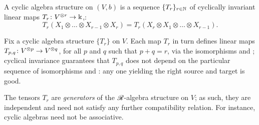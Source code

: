 \begin{definition}\label{dfn:cyclic-algebra}
  A cyclic algebra structure on $(V, b)$ is a sequence
  $\{T_r\}_{r\in\mathbb{N}}$ of cyclically invariant linear maps $T_r \colon
  V\sp{\otimes r} \to \Bbbk$,:
  \begin{equation*}
    T_r (X_1 \otimes \dots \otimes X_{r-1} \otimes X_r) = 
    T_r (X_r \otimes X_1 \otimes \dots \otimes X_{r-1}).
  \end{equation*}
\end{definition}
Fix a cyclic algebra structure $\{T_r\}$ on $V$.  Each map $T_r$
in turn defines linear maps $T_{p,q}\colon V\sp{\otimes p} \to V\sp{\otimes q}$, for all
$p$ and $q$ such that $p+q=r$, via the isomorphisms
 and ; cyclical
invariance guarantees that $T_{p,q}$ does not depend on the
particular sequence of isomorphisms  and
: any one yielding the right source and
target is good.
\begin{remark}
  The tensors $T_r$ are \emph{generators} of the $\mathscr{R}_{}$-algebra
  structure on $V$; as such, they are independent and need not satisfy
  any further compatibility relation. For instance, cyclic algebras
  need not be associative.
\end{remark}

